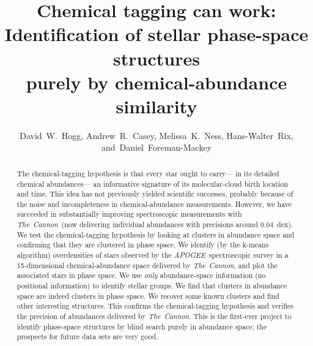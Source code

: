 \documentclass[12pt, letterpaper, preprint]{aastex}
\newcommand{\acronym}[1]{{\small{#1}}}
\newcommand{\project}[1]{\textsl{#1}}
\newcommand{\apogee}{\project{\acronym{APOGEE}}}
\newcommand{\thecannon}{\project{The~Cannon}}
\begin{document}
\sloppy\sloppypar

\title{Chemical tagging can work: \\
       Identification of stellar phase-space structures \\
       purely by chemical-abundance similarity}
\author{David~W.~Hogg,
        Andrew~R.~Casey,
        Melissa~K.~Ness,
        Hans-Walter~Rix,
    and~Daniel~Foreman-Mackey}

\begin{abstract}
The chemical-tagging hypothesis is that every star ought to carry---%
in its detailed chemical abundances---%
an informative signature of its molecular-cloud birth location and time.
This idea has not previously yielded scientific successes, probably because of the
noise and incompleteness in chemical-abundance measurements.
However, we have succeeded in substantially improving spectroscopic measurements with \thecannon\ 
(now delivering individual abundances with precisions around 0.04~dex).
We test the chemical-tagging hypothesis by looking at clusters in abundance space
and confirming that they are clustered in phase space.
We identify (by the k-means algorithm) overdensities of stars observed by the \apogee\ spectroscopic survey
in a 15-dimensional chemical-abundance space delivered by \thecannon,
and plot the associated stars in phase space.
We use \emph{only} abundance-space information (no positional information) to identify stellar groups.
We find that clusters in abundance space are indeed clusters in phase space.
We recover some known clusters and find other interesting structures.
This confirms the chemical-tagging hypothesis and verifies the precision of abundances delivered by \thecannon.
This is the first-ever project to identify phase-space structures by blind search purely in abundance space;
the prospects for future data sets are very good.
\end{abstract}
\end{document}
